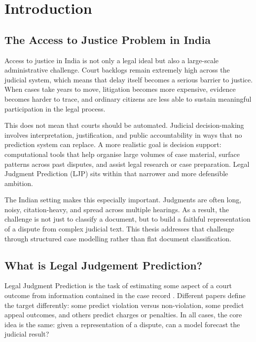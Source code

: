 \chapter{Introduction}

\section{The Access to Justice Problem in India}

Access to justice in India is not only a legal ideal but also a large-scale administrative challenge. Court backlogs remain extremely high across the judicial system, which means that delay itself becomes a serious barrier to justice. When cases take years to move, litigation becomes more expensive, evidence becomes harder to trace, and ordinary citizens are less able to sustain meaningful participation in the legal process.

This does not mean that courts should be automated. Judicial decision-making involves interpretation, justification, and public accountability in ways that no prediction system can replace. A more realistic goal is decision support: computational tools that help organise large volumes of case material, surface patterns across past disputes, and assist legal research or case preparation. Legal Judgment Prediction (LJP) sits within that narrower and more defensible ambition.

The Indian setting makes this especially important. Judgments are often long, noisy, citation-heavy, and spread across multiple hearings. As a result, the challenge is not just to classify a document, but to build a faithful representation of a dispute from complex judicial text. This thesis addresses that challenge through structured case modelling rather than flat document classification.

\section{What is Legal Judgement Prediction?}

Legal Judgment Prediction is the task of estimating some aspect of a court outcome from information contained in the case record \cite{aletras2016echr, katz2017supreme, medvedeva2020echr}. Different papers define the target differently: some predict violation versus non-violation, some predict appeal outcomes, and others predict charges or penalties. In all cases, the core idea is the same: given a representation of a dispute, can a model forecast the judicial result?

